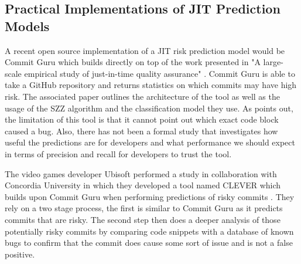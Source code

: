 \documentclass[../main.tex]{subfiles}
\begin{document}
\subsection{Practical Implementations of JIT Prediction Models}

A recent open source implementation of a JIT risk prediction model would be Commit Guru which builds directly on top of the work presented in "A large-scale empirical study of just-in-time quality assurance" \cite{rosen2015commit}. Commit Guru is able to take a GitHub repository and returns statistics on which commits may have high risk. The associated paper outlines the architecture of the tool as well as the usage of the SZZ algorithm and the classification model they use. As \cite{nayrolles2018clever} points out, the limitation of this tool is that it cannot point out which exact code block caused a bug. Also, there has not been a formal study that investigates how useful the predictions are for developers and what performance we should expect in terms of precision and recall for developers to trust the tool. 

The video games developer Ubisoft performed a study in collaboration with Concordia University in which they developed a tool named CLEVER which builds upon Commit Guru when performing predictions of risky commits \cite{nayrolles2018clever}. They rely on a two stage process, the first is similar to Commit Guru as it predicts commits that are risky. The second step then does a deeper analysis of those potentially risky commits by comparing code snippets with a database of known bugs to confirm that the commit does cause some sort of issue and is not a false positive. 
\end{document}
